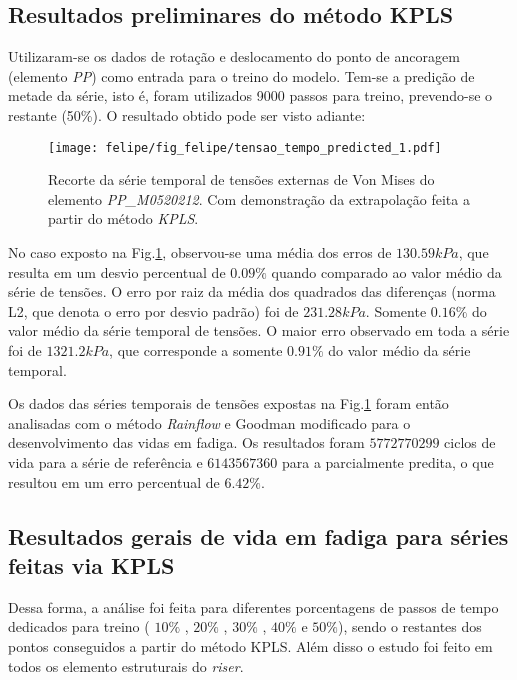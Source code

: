 \subsection{Resultados preliminares do método KPLS}

Utilizaram-se os dados de rotação e deslocamento do ponto de ancoragem (elemento \emph{PP}) como entrada para o treino do modelo. Tem-se a predição de metade da série, isto é, foram utilizados 9000 passos para treino, prevendo-se o restante (50\%). O resultado obtido pode ser visto adiante:

\begin{figure}[!ht]
    \centering
    \texttt{[image: felipe/fig\_felipe/tensao\_tempo\_predicted\_1.pdf]} 
    \caption{Recorte da série temporal de tensões externas de Von Mises do elemento \emph{PP\_M0520212}. Com demonstração da extrapolação feita a partir do método \emph{KPLS}.}
    \label{serie_tensao_predicted_1}
\end{figure}

No caso exposto na Fig.\ref{serie_tensao_predicted_1}, observou-se uma média dos erros de $130.59 kPa$, que resulta em um desvio percentual de $0.09\%$ quando comparado ao valor médio da série de tensões. O erro por raiz da média dos quadrados das diferenças (norma L2, que denota o erro por desvio padrão) foi de $231.28 kPa$. Somente $0.16\%$ do valor médio da série temporal de tensões. O maior erro observado em toda a série foi de $1321.2 kPa$, que corresponde a somente $0.91\%$ do valor médio da série temporal.

Os dados das séries temporais de tensões expostas na Fig.\ref{serie_tensao_predicted_1} foram então analisadas com o método \emph{Rainflow} e Goodman modificado para o desenvolvimento das vidas em fadiga. Os resultados foram $5772770299$ ciclos de vida para a série de referência e $6143567360$ para a parcialmente predita, o que resultou em um erro percentual de $6.42\%$.

\subsection{Resultados gerais de vida em fadiga para séries feitas via KPLS}

Dessa forma, a análise foi feita para diferentes porcentagens de passos de tempo dedicados para treino ( $10\%$ , $20\%$ , $30\%$ , $40\%$ e $50\%$), sendo o restantes dos pontos conseguidos a partir do método KPLS. Além disso o estudo foi feito em todos os elemento estruturais do \emph{riser}.

